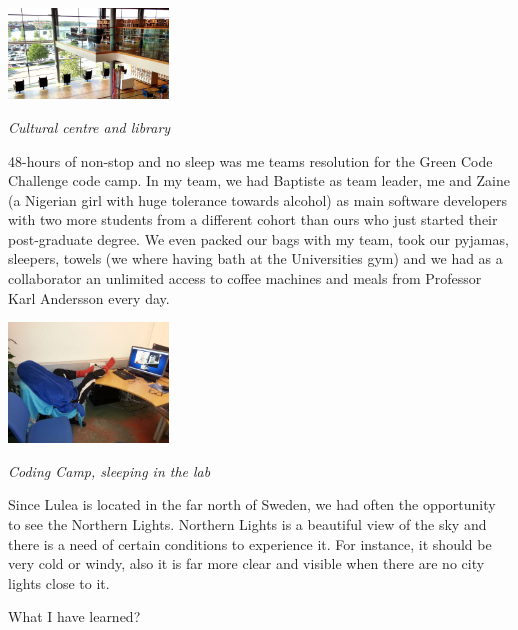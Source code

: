 \documentclass[10pt,a4paper]{article} %
\newcommand{\NewsItem}[1]{ %
\usefont{T1}{fvs}{n}{n} %
\vspace{24pt}\large #1\vspace{3pt} %
\par \normalsize \normalfont}
\begin{document}
\begin{multicols}{3}
\begin{center}
	\includegraphics[width=0.32\textwidth]{media/cultural_centre_lulea.jpg}
	\par\textit{Cultural centre and library}
\end{center}


48-hours of non-stop and no sleep was me teams resolution for the Green Code Challenge 
code camp. 
In my team, we had Baptiste as team leader, me and Zaine (a Nigerian girl with huge 
tolerance towards alcohol) as main software developers with two more students 
from a different cohort than ours who just started their post-graduate degree.  
We even packed our bags with my team, took our pyjamas, sleepers, towels 
(we where having bath at the Universities gym) and we had as a collaborator an 
unlimited access to coffee machines and meals from Professor Karl Andersson every 
day. 


\begin{center}
	\includegraphics[width=0.32\textwidth]{media/coding_camp.jpg}
	\par\textit{Coding Camp, sleeping in the lab}
\end{center}
  
Since Lulea is located in the far north of Sweden, we had often the opportunity to 
see the Northern Lights. 
Northern Lights is a beautiful view of the sky and there is a need of certain 
conditions to experience it. 
For instance, it should be very cold or windy, also it is far more clear and visible 
when there are no city lights close to it. 
 



\NewsItem{What I have learned?}


\end{multicols}
\end{document}
